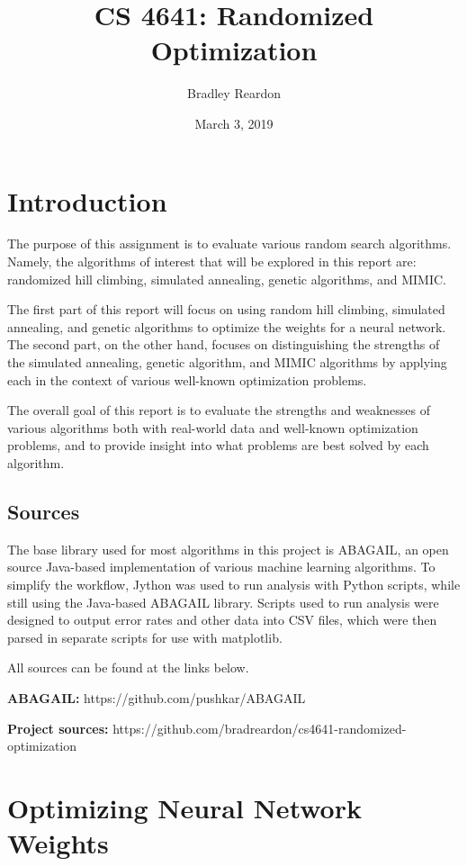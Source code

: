 \documentclass{article}
\title{\textbf{CS 4641:} Randomized Optimization}
\author{Bradley Reardon}
\date{March 3, 2019}
\begin{document}
  \maketitle

  \section{Introduction}
    The purpose of this assignment is to evaluate various random search algorithms. Namely, the algorithms of interest that will be explored in this report are: randomized hill climbing, simulated annealing, genetic algorithms, and MIMIC.

    The first part of this report will focus on using random hill climbing, simulated annealing, and genetic algorithms to optimize the weights for a neural network. The second part, on the other hand, focuses on distinguishing the strengths of the simulated annealing, genetic algorithm, and MIMIC algorithms by applying each in the context of various well-known optimization problems.

    The overall goal of this report is to evaluate the strengths and weaknesses of various algorithms both with real-world data and well-known optimization problems, and to provide insight into what problems are best solved by each algorithm.

    \subsection{Sources}
      The base library used for most algorithms in this project is ABAGAIL, an open source Java-based implementation of various machine learning algorithms. To simplify the workflow, Jython was used to run analysis with Python scripts, while still using the Java-based ABAGAIL library. Scripts used to run analysis were designed to output error rates and other data into CSV files, which were then parsed in separate scripts for use with matplotlib.

      All sources can be found at the links below.

      \textbf{ABAGAIL:} https://github.com/pushkar/ABAGAIL

      \textbf{Project sources:} https://github.com/bradreardon/cs4641-randomized-optimization

  \section{Optimizing Neural Network Weights}
\end{document}
